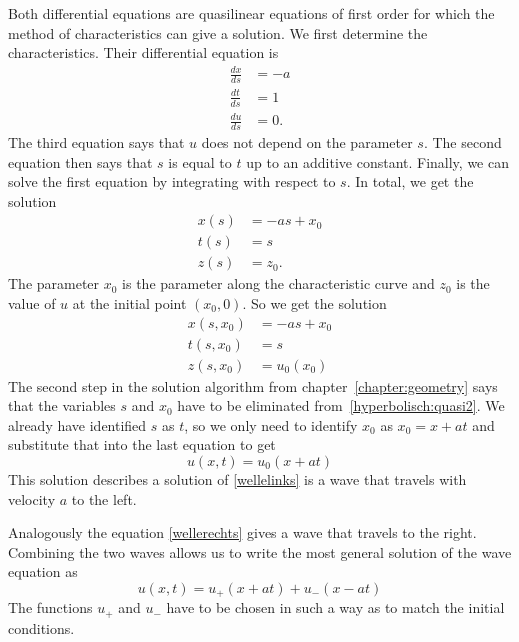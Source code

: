 Both differential equations are quasilinear equations of first order
for which the method of characteristics can give a solution.
We first determine the characteristics.
Their differential equation is
\begin{align*}
\frac{dx}{ds}&=-a
\\
\frac{dt}{ds}&=1
\\
\frac{du}{ds}&=0.
\end{align*}
The third equation says that $u$ does not depend on the parameter $s$.
The second equation then says that $s$ is equal to $t$ up to an additive
constant.
Finally, we can solve the first equation by integrating with respect to $s$.
In total, we get the solution
\begin{equation}
\begin{aligned}
x(s)&=-as+x_0\\
t(s)&=s\\
z(s)&=z_0.
\end{aligned}
\label{hyperbolisch:quasi1}
\end{equation}
The parameter $x_0$ is the parameter along the characteristic curve
and $z_0$ is the value of $u$ at the initial point $(x_0,0)$.
So we get the solution
\begin{equation}
\begin{aligned}
x(s,x_0)&=-as+x_0\\
t(s,x_0)&=s\\
z(s,x_0)&=u_0(x_0)
\end{aligned}
\label{hyperbolisch:quasi2}
\end{equation}
The second step in the solution algorithm from chapter~\ref{chapter:geometry}
says that the variables $s$ and $x_0$ have to be eliminated
from~\eqref{hyperbolisch:quasi2}.
We already have identified $s$ as $t$, so we only need to identify
$x_0$ as $x_0=x+at$ and substitute that into the last equation to get
\begin{equation}
u(x,t) = u_0(x+at)
\label{hyperbolisch:quasi3}
\end{equation}
This solution describes a solution of \eqref{wellelinks}
is a wave that travels with velocity $a$ to the left.

Analogously the equation \eqref{wellerechts} gives a wave that
travels to the right.
Combining the two waves allows us to write the most general solution
of the wave equation as
\begin{equation}
u(x,t)=u_+(x+at)+u_-(x-at)
\label{dalembertloesung}
\end{equation}
The functions $u_+$ and $u_-$ have to be chosen in such a way as to
match the initial conditions.

